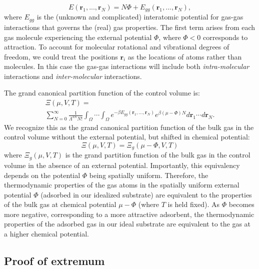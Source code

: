 \documentclass[pre,twocolumn]{revtex4-2}
\newcommand{\rvec}{\mathbf{r}}
\newcommand\V{\Phi}
\begin{document}
\begin{equation} E(\rvec_1,...,\rvec_N) = N\V +
E_{gg}(\rvec_1,...,\rvec_N),
\end{equation}
where $E_{gg}$ is the (unknown and complicated) interatomic potential for
gas-gas interactions that governs the (real) gas properties. The first term
arises from each gas molecule experiencing the external potential $\V$, where
$\V < 0$ corresponds to attraction. To account for molecular rotational and
vibrational degrees of freedom, we could treat the positions $\rvec_i$ as the
locations of atoms rather than molecules. In this case the gas-gas interactions
will include both \emph{intra-molecular} interactions and
\emph{inter-molecular} interactions.

The grand canonical partition function of the control volume is:
\begin{multline}
    \Xi(\mu, V, T)= \\ \displaystyle \sum_{N=0}^\infty \frac{1}{\Lambda^{3N}N!} \int_{\Omega} \cdots \int_{\Omega} e^{-\beta E_{gg}(\rvec_1, ..., \rvec_N)} e^{\beta (\mu - \V) N} d\rvec_1 \cdots d\rvec_N.
    \label{eq:gcpf}
\end{multline}
We recognize this as the grand canonical partition function of the bulk gas in
the control volume without the external potential, but shifted in chemical
potential:
\begin{equation}
    \Xi(\mu, V, T)=\Xi_g(\mu - \V, V, T)
    \label{eq:xi_vs_xi0}
\end{equation}
where $\Xi_g(\mu, V, T)$ is the grand partition function of the bulk
gas in the control volume in the absence of an external potential. Importantly,
this equivalency depends on the potential $\V$ being spatially uniform.
Therefore, the thermodynamic properties of the gas atoms in the spatially
uniform external potential $\V$ (adsorbed in our idealized substrate)
are equivalent to the properties of the bulk gas at chemical potential $\mu-\V$
(where $T$ is held fixed). As $\V$ becomes more negative, corresponding to a
more attractive adsorbent, the thermodynamic properties of the adsorbed gas in
our ideal substrate are equivalent to the gas at a higher chemical potential.

\subsection{Proof of extremum}\label{sec:proof-extremum}
\end{document}
